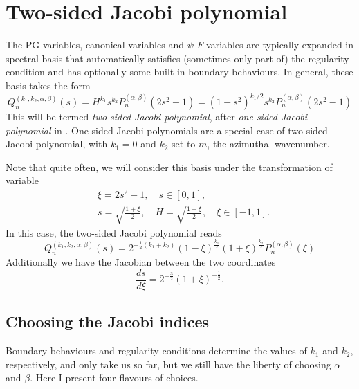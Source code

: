 \section{Two-sided Jacobi polynomial}

The PG variables, canonical variables and $\psi$-$F$ variables are typically expanded in spectral basis that automatically satisfies (sometimes only part of) the regularity condition and has optionally some built-in boundary behaviours. In general, these basis takes the form
%
\begin{equation}
    Q_n^{(k_1, k_2, \alpha, \beta)}(s) = H^{k_1} s^{k_2} P_n^{(\alpha, \beta)}(2s^2 - 1) = (1 - s^2)^{k_1/2} s^{k_2} P_n^{(\alpha, \beta)}(2s^2 - 1)
\end{equation}
%
This will be termed \textit{two-sided Jacobi polynomial}, after \textit{one-sided Jacobi polynomial} in \citet{boyd_comparing_2011}. One-sided Jacobi polynomials are a special case of two-sided Jacobi polynomial, with $k_1 = 0$ and $k_2$ set to $m$, the azimuthal wavenumber.

Note that quite often, we will consider this basis under the transformation of variable
%
\begin{equation}\begin{aligned}
    &\xi = 2s^2 - 1,\quad s \in [0, 1],\\
    &s = \sqrt{\frac{1 + \xi}{2}},\quad H = \sqrt{\frac{1 - \xi}{2}},\quad \xi \in [-1, 1].
\end{aligned}\end{equation}
%
In this case, the two-sided Jacobi polynomial reads
%
\begin{equation}
    Q_n^{(k_1, k_2, \alpha, \beta)}(s) = 2^{-\frac{1}{2}(k_1 + k_2)} (1 - \xi)^{\frac{k_1}{2}} (1 + \xi)^{\frac{k_2}{2}} P_n^{(\alpha, \beta)}(\xi)
\end{equation}
%
Additionally we have the Jacobian between the two coordinates
%
\begin{equation}
    \frac{ds}{d\xi} = 2^{-\frac{3}{2}} (1 + \xi)^{-\frac{1}{2}}.
\end{equation}

\subsection{Choosing the Jacobi indices}

Boundary behaviours and regularity conditions determine the values of $k_1$ and $k_2$, respectively, and only take us so far, but we still have the liberty of choosing $\alpha$ and $\beta$. Here I present four flavours of choices.

